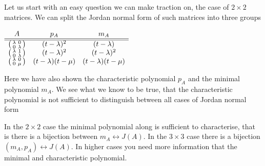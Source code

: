 \documentclass{article}
\begin{document}
\subsection{}
Let us start with an easy question we can make traction on, the case of $2 \times 2$ matrices. We can split the Jordan normal form of such matrices into three groups 
\begin{center}
	$
	\begin{array}{ccc}
		A & p_A & m_A \\
		\hline \hline 
	 	\begin{psmallmatrix} \lambda & 0 \\ 0 & \lambda \end{psmallmatrix} & (t-\lambda)^2 & (t-\lambda) \\
	 			\begin{psmallmatrix} \lambda & 1 \\ 0 & \lambda \end{psmallmatrix} & (t-\lambda)^2 & (t-\lambda)^2 \\
	 					\begin{psmallmatrix} \lambda & 0 \\ 0 & \mu \end{psmallmatrix} & (t-\lambda)(t-\mu) & (t-\lambda)(t-\mu)
	\end{array}
	$
\end{center}
Here we have also shown the characteristic polynomial $p_A$ and the minimal polynomial $m_A$. We see what we know to be true, that the characteristic polynomial is not sufficient to distinguish between all cases of Jordan normal form

\begin{remark}
In the $2 \times 2$ case the minimal polynomial along is sufficient to characterise, that is there is a bijection between $m_A \leftrightarrow J(A)$. In the $3 \times 3$ case there is a bijection $(m_A,p_A) \leftrightarrow J(A)$. In higher cases you need more information that the minimal and characteristic polynomial. 
\end{remark}
\end{document}
